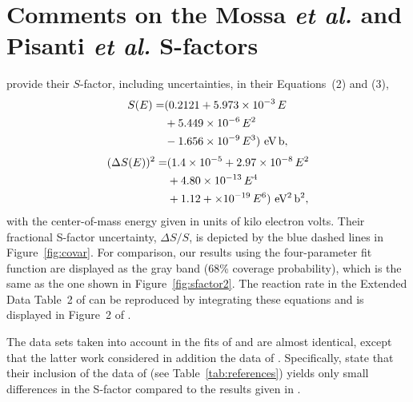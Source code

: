 \documentclass[twocolumn]{aastex63}
\begin{document}
\section{Comments on the Mossa {\it et al.} and Pisanti {\it et al.} S-factors}
\label{sec:app2}
\citet{Mossa20} provide their $S$-factor, including uncertainties, in their Equations~(2) and (3), 
%
\begin{align}\label{eq:mos2}
S(E) = & ( 0.2121 + 5.973\times10^{-3}\,E \notag \\ 
& + 5.449\times10^{-6}\,E^2  \notag \\
&  - 1.656\times10^{-9}\,E^3 ) ~ \text{eV\,b},
\end{align}
%
\begin{align}\label{eq:mos}
(\Delta S(E))^2 = & (1.4 \times 10^{-5} + 2.97 \times 10^{-8}\,E^2 \notag \\
& + 4.80 \times 10^{-13}\,E^4 \notag \\
& + 1.12 + \times 10^{-19}\,E^6) ~ \text{eV$^2$\,b$^2$},
\end{align}
%
with the center-of-mass energy given in units of kilo electron volts. Their fractional S-factor uncertainty, $\Delta S/S$, is depicted by the blue dashed lines in Figure~\ref{fig:covar}. For comparison, our results using the four-parameter fit function are displayed as the gray band (68\% coverage probability), which is the same as the one shown in Figure~\ref{fig:sfactor2}. The reaction rate in the Extended Data Table~2 of \citet{Mossa20} can be reproduced by integrating these equations and is displayed in Figure~2 of \citet{Pit21}. 

The data sets taken into account in the fits of \citet{Mossa20} and \citet{Pis21} are almost identical, except that the latter work considered in addition the data of \citet{Tisma:2019ug}. Specifically, \citet{Pis21} state that their inclusion of the data of \citet{Tisma:2019ug} (see Table~\ref{tab:references}) yields only small differences in the S-factor compared to the results given in \citet{Mossa20}. 
\end{document}
